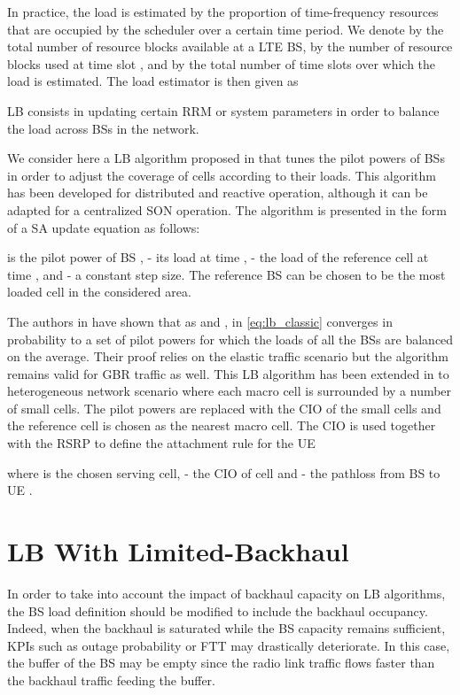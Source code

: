\documentclass[10pt,draftclsnofoot,onecolumn]{IEEEtran}
\begin{document}
    In practice, the load is estimated by the proportion of time-frequency resources that
are occupied by the scheduler over a certain time period. We denote
by  the total number of resource blocks available at a \ac{LTE}
\ac{BS}, by  the number of resource blocks used at time slot
, and by  the total number of time slots over which the load is
estimated. The load estimator is then given as

    
\ac{LB} consists in updating certain \ac{RRM} or system parameters in order to balance the load across \acp{BS} in the network.

We consider here a \ac{LB} algorithm proposed in
\cite{combes_selforganizationwireless_2012} that tunes the pilot
powers of \acp{BS} in order to adjust the coverage of cells
according to their loads. This algorithm has been developed for
distributed and reactive operation, although it can be adapted for a
centralized \ac{SON} operation. The algorithm is presented in the
form of a \ac{SA} update equation as follows:

    
 is the pilot power of \ac{BS} ,  - its load
at time ,  - the load of the reference cell at time
, and  - a constant step size. The reference \ac{BS} can
be chosen to be the most loaded cell in the considered area.

    The authors in \cite{combes_selforganizationwireless_2012} have 
shown that as  and ,  in \eqref{eq:lb_classic} 
converges in probability to a set of pilot powers for which the
loads of all the \acp{BS} are balanced on the average. Their proof
relies on the elastic traffic scenario but the algorithm remains
valid for \ac{GBR} traffic as well. This \ac{LB} algorithm
has been extended in \cite{tall_selforganizingstrategies_2014} to
heterogeneous network scenario where each macro cell is surrounded by a
number of small cells. The pilot powers are replaced with the
\ac{CIO} of the small cells and the reference cell is chosen as the
nearest macro cell. The \ac{CIO} is used together with the \ac{RSRP} to define the attachment rule for the \ac{UE}

where  is the chosen serving cell,  - the \ac{CIO} of cell  and  - the pathloss from \ac{BS}  to \ac{UE} .




\section{\ac{LB} With Limited-Backhaul} \label{sec:BHcontrainedLB}

    In order to take into account the impact of backhaul capacity
on \ac{LB} algorithms, the \ac{BS} load definition should be
modified to include the backhaul occupancy. Indeed, when the
backhaul is saturated while the \ac{BS} capacity remains
sufficient, \acp{KPI} such as outage probability or \ac{FTT} may
drastically deteriorate. In this case, the buffer of the \ac{BS}
may be empty since the radio link traffic flows faster than the backhaul
traffic feeding the buffer.
\end{document}

